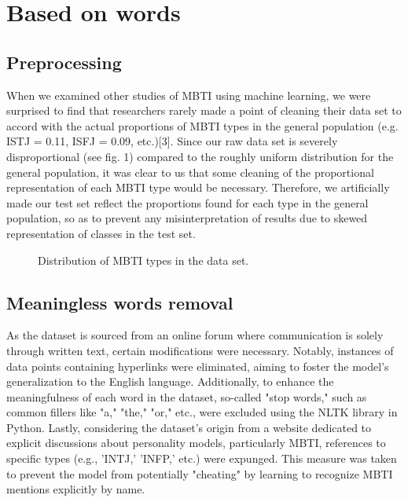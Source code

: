 \documentclass{article}
\begin{document}
\section{Based on words}
\subsection{Preprocessing}
When we examined other studies of MBTI using machine learning, we were surprised to find that researchers rarely made a point of cleaning their data set to accord with the actual proportions of MBTI types in the general population (e.g. ISTJ = 0.11, ISFJ = 0.09, etc.)[3]. Since our raw data set is severely disproportional (see fig. 1) compared to the roughly uniform distribution for the general population, it was clear to us that some cleaning of the proportional representation of each MBTI type would be necessary. Therefore, we artificially made our test set reflect the proportions found for each type in the general population, so as to prevent any misinterpretation of results due to skewed representation of classes in the test set.
\begin{figure}
  \centering
  \caption{ Distribution of MBTI types in the data set.}
\end{figure}
\subsection{Meaningless words removal}
As the dataset is sourced from an online forum where communication is solely through written text, certain modifications were necessary. Notably, instances of data points containing hyperlinks were eliminated, aiming to foster the model's generalization to the English language. Additionally, to enhance the meaningfulness of each word in the dataset, so-called "stop words," such as common fillers like "a," "the," "or," etc., were excluded using the NLTK library in Python. Lastly, considering the dataset's origin from a website dedicated to explicit discussions about personality models, particularly MBTI, references to specific types (e.g., 'INTJ,' 'INFP,' etc.) were expunged. This measure was taken to prevent the model from potentially "cheating" by learning to recognize MBTI mentions explicitly by name.
\end{document}
